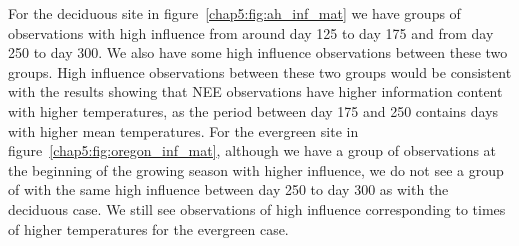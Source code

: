 For the deciduous site in figure~\ref{chap5:fig:ah_inf_mat} we have groups of observations with high influence from around day 125 to day 175 and from day 250 to day 300. We also have some high influence observations between these two groups. High influence observations between these two groups would be consistent with the results showing that NEE observations have higher information content with higher temperatures, as the period between day 175 and 250 contains days with higher mean temperatures. For the evergreen site in figure~\ref{chap5:fig:oregon_inf_mat}, although we have a group of observations at the beginning of the growing season with higher influence, we do not see a group of with the same high influence between day 250 to day 300 as with the deciduous case. We still see observations of high influence corresponding to times of higher temperatures for the evergreen case. 

